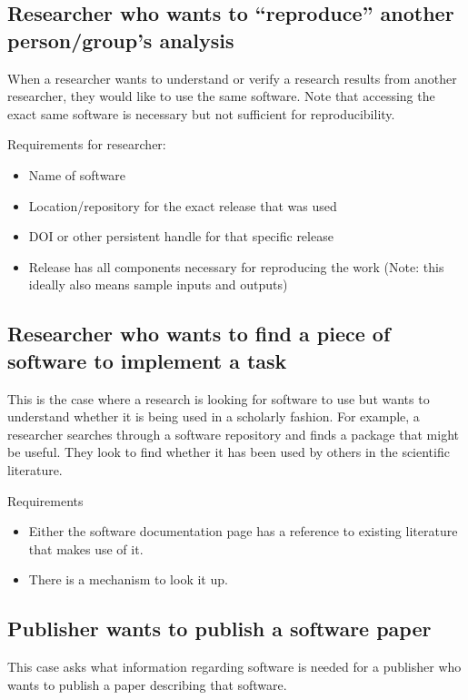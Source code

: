 \documentclass[12pt, oneside]{amsart}
\begin{document}
\subsection{Researcher who wants to ``reproduce'' another person\slash group's analysis}

When a researcher wants to understand or verify a research results from another researcher, they
would like to use the same software.  Note that accessing the exact same software is necessary but not sufficient for reproducibility.

Requirements for researcher:
\begin{itemize}
\item Name of software
\item Location/repository for the exact release that was used
\item DOI or other persistent handle for that specific release
\item Release has all components necessary for reproducing the work (Note: this ideally also means sample inputs and outputs)
\end{itemize}

\subsection{Researcher who wants to find a piece of software to implement a task}

This is the case where a research is looking for software to use but wants to understand whether it is being used in a scholarly fashion.
For example, a researcher searches through a software repository and finds a package that might be useful.
They look to find whether it has been used by others in the scientific literature.

Requirements
\begin{itemize}
\item Either the software documentation page has a reference to existing literature that makes use of it.
\item There is a mechanism to look it up.
\end{itemize}

\subsection{Publisher wants to publish a software paper}

This case asks what information regarding software is needed for a publisher who wants to publish a paper describing that software.
\end{document}

